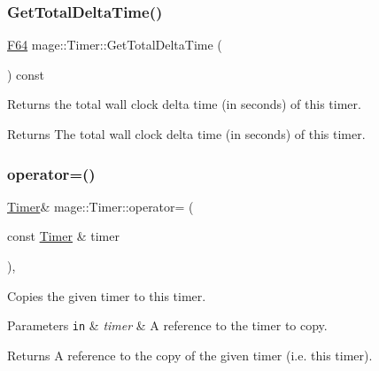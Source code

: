 \subsubsection{\texorpdfstring{Get\+Total\+Delta\+Time()}{GetTotalDeltaTime()}}
{\footnotesize\ttfamily \hyperlink{namespacemage_ad26233bbec640deda836e572c1a23708}{F64} mage\+::\+Timer\+::\+Get\+Total\+Delta\+Time (\begin{DoxyParamCaption}{ }\end{DoxyParamCaption}) const\hspace{0.3cm}{\ttfamily [noexcept]}}

Returns the total wall clock delta time (in seconds) of this timer.

\begin{DoxyReturn}{Returns}
The total wall clock delta time (in seconds) of this timer. 
\end{DoxyReturn}
\hypertarget{classmage_1_1_timer_a607d4bce80a92977bc8394c8774a6434}{}\label{classmage_1_1_timer_a607d4bce80a92977bc8394c8774a6434} 
\subsubsection{\texorpdfstring{operator=()}{operator=()}\hspace{0.1cm}{\footnotesize\ttfamily [1/2]}}
{\footnotesize\ttfamily \hyperlink{classmage_1_1_timer}{Timer}\& mage\+::\+Timer\+::operator= (\begin{DoxyParamCaption}\item[{const \hyperlink{classmage_1_1_timer}{Timer} \&}]{timer }\end{DoxyParamCaption})\hspace{0.3cm}{\ttfamily [default]}, {\ttfamily [noexcept]}}

Copies the given timer to this timer.


\begin{DoxyParams}[1]{Parameters}
\mbox{\tt in}  & {\em timer} & A reference to the timer to copy. \\
\hline
\end{DoxyParams}
\begin{DoxyReturn}{Returns}
A reference to the copy of the given timer (i.\+e. this timer). 
\end{DoxyReturn}
\hypertarget{classmage_1_1_timer_a38d7c1fe4c4061c56286183032dc67d8}{}\label{classmage_1_1_timer_a38d7c1fe4c4061c56286183032dc67d8} 
